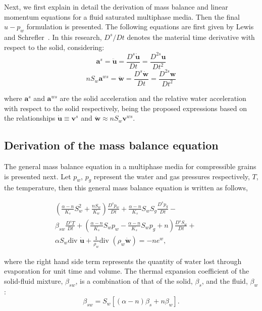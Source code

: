 \documentclass[twocolumn]{svjour3}          %
\begin{document}
Next, we first  explain in detail the derivation of mass balance and linear momentum equations for a fluid saturated multiphase media. Then the final $u-p_w$ formulation is presented. The following equations are first given by Lewis and Schrefler~\cite{LewisSchrefler98}. In this research, $D^s/Dt$ denotes the material time derivative with respect to the solid, considering:
$$
\boldsymbol{a}^s =  \ddot{\boldsymbol{u}} = \frac{D^s \dot{\boldsymbol{u}}}{Dt} = \frac{D^{2s} \boldsymbol{u}}{Dt^2}
$$
$$
n S_w \boldsymbol{a}^{ws} =  \ddot{\boldsymbol{w}} = \frac{D^s \dot{\boldsymbol{w}}}{Dt} = \frac{D^{2s} \boldsymbol{w}}{Dt^2}
$$

where  $\boldsymbol{a}^s$ and $\boldsymbol{a}^{ws}$ are the solid acceleration and the relative water acceleration with respect to the solid respectively, being the proposed expressions based on the relationships $\boldsymbol{\dot{u}} \equiv \boldsymbol{v}^{s}$ and $\boldsymbol{\dot{w}} \approx nS_w \boldsymbol{v}^{ws}$.


\subsection{Derivation of the mass balance equation}\label{subsec:21}
The general mass balance equation in a multiphase media for compressible grains is presented next. 
Let $p_w$, $p_g$ represent the water and gas pressures respectively, $T$, the temperature, %
then this general mass balance equation is written as follows,

\begin{eqnarray}\label{eq_uw6}
\left( \frac{\alpha-n}{K_s}S_w^2+\frac{nS_w}{K_w}\right)\frac{D^s p_w}{D t} + \frac{\alpha-n}{K_s}S_wS_g\frac{D^s p_g}{D t} -&&  \nonumber \\ 
 \beta_{sw}\frac{D^s T}{D t} +  \left(\frac{\alpha-n}{K_s}S_w p_w-\frac{\alpha-n}{K_s}S_w p_g+n\right)\frac{D^s S_w}{D t}  +&&  \nonumber \\ 
\alpha S_w  \mbox{div } \dot{\boldsymbol{u}}  + \frac{1}{\rho_w} \mbox{div } (\rho_w \dot{\boldsymbol{w}}) = - n e^w, &&  %
\end{eqnarray}

where the right hand side term represents the quantity of water lost through evaporation for unit time and volume. The  thermal expansion coefficient of the solid-fluid mixture, $\beta_{sw}$, is a combination of that of the solid, $\beta_s$, and  the fluid, $\beta_w$:
\begin{equation}
\beta_{sw} = S_w [(\alpha-n)\beta_s +n \beta_w].
\end{equation}
\end{document}
